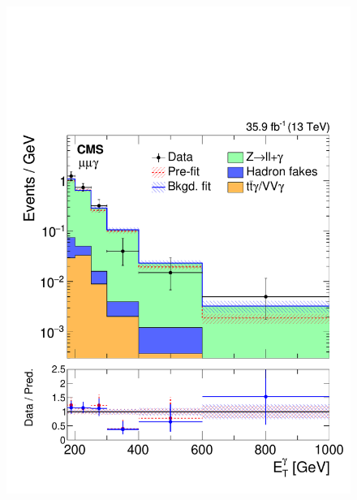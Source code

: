 \begin{figure}[htbp]
{    \includegraphics[]{Analysis/Figures/results/bonly_dimu.pdf}
  }
  \resizebox{\textwidth}{!}{
}
\end{figure}
